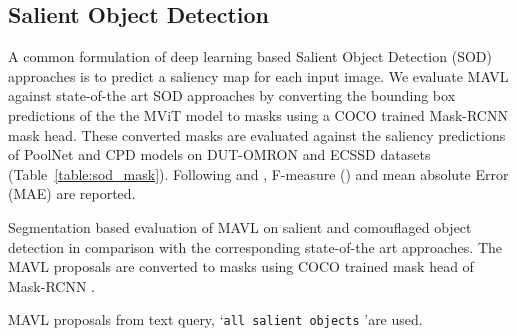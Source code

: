 \documentclass[runningheads]{llncs}
\newcommand{\txt}[1]{{\texttt{#1}}}
\begin{document}
\subsection{Salient Object Detection}\label{app:add_results_sod}
A common formulation of deep learning based Salient Object Detection (SOD) approaches is to predict a saliency map for each input image. We evaluate MAVL against state-of-the art SOD approaches by converting the bounding box predictions of the the MViT model to masks using a COCO \cite{coco} trained Mask-RCNN \cite{he2017mask} mask head. These converted masks are evaluated against the saliency predictions of PoolNet \cite{liu2019simple} and CPD \cite{wu2019cascaded} models on DUT-OMRON \cite{yang2013saliency} and ECSSD \cite{shi2015hierarchical} datasets (Table~\ref{table:sod_mask}). Following \cite{liu2019simple} and \cite{wu2019cascaded}, F-measure () and mean absolute Error (MAE) are reported. 

\begin{table}[!h]
\caption{Segmentation based evaluation of MAVL on salient and comouflaged object detection in comparison with the corresponding state-of-the art approaches. The MAVL proposals are converted to masks using COCO \cite{coco} trained mask head of Mask-RCNN \cite{he2017mask}.}
\setlength\tabcolsep{4pt}
    \begin{subtable}[t]{0.49\linewidth}
        \caption{\small 
        MAVL proposals from text query, \lq \txt{all salient objects} \rq are used.
        }
        \label{table:sod_mask}
    \end{subtable}
    \begin{subtable}[t]{0.49\linewidth}
        \caption{\small 
        MAVL proposals generated using \lq \txt{all camouflaged objects}\rq~query are used.
        }
        \label{table:cod_mask}
    \end{subtable}
\end{table}
\end{document}
